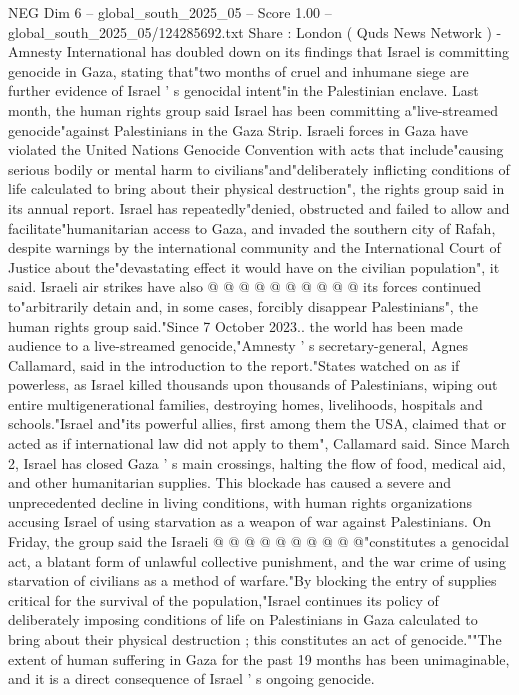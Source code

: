 \begin{textsample}{NEG Dim 6 – global\_south\_2025\_05 – Score 1.00 – global\_south\_2025\_05/124285692.txt}  \label{ex:f6_neg_420}
Share : London ( Quds News Network ) - Amnesty International has doubled down on its findings that Israel is committing genocide in Gaza, stating that"two months of cruel and inhumane siege are further evidence of Israel ' s genocidal intent"in the Palestinian enclave.
Last month, the human rights group said Israel has been committing a"live-streamed genocide"against Palestinians in the Gaza Strip.
Israeli forces in Gaza have violated the United Nations Genocide Convention with acts that include"causing serious bodily or mental harm to civilians"and"deliberately inflicting conditions of life calculated to bring about their physical destruction", the rights group said in its annual report.
Israel has repeatedly"denied, obstructed and failed to allow and facilitate"humanitarian access to Gaza, and invaded the southern city of Rafah, despite warnings by the international community and the International Court of Justice about the"devastating effect it would have on the civilian population", it said.
Israeli air strikes have also @ @ @ @ @ @ @ @ @ @ its forces continued to"arbitrarily detain and, in some cases, forcibly disappear Palestinians", the human rights group said."Since 7 October 2023.. the world has been made audience to a live-streamed genocide,"Amnesty ' s secretary-general, Agnes Callamard, said in the introduction to the report."States watched on as if powerless, as Israel killed thousands upon thousands of Palestinians, wiping out entire multigenerational families, destroying homes, livelihoods, hospitals and schools."Israel and"its powerful allies, first among them the USA, claimed that or acted as if international law did not apply to them", Callamard said.
Since March 2, Israel has closed Gaza ' s main crossings, halting the flow of food, medical aid, and other humanitarian supplies.
This blockade has caused a severe and unprecedented decline in living conditions, with human rights organizations accusing Israel of using starvation as a weapon of war against Palestinians.
On Friday, the group said the Israeli @ @ @ @ @ @ @ @ @ @"constitutes a genocidal act, a blatant form of unlawful collective punishment, and the war crime of using starvation of civilians as a method of warfare."By blocking the entry of supplies critical for the survival of the population,"Israel continues its policy of deliberately imposing conditions of life on Palestinians in Gaza calculated to bring about their physical destruction ; this constitutes an act of genocide.""The extent of human suffering in Gaza for the past 19 months has been unimaginable, and it is a direct consequence of Israel ' s ongoing genocide.

\end{textsample}
